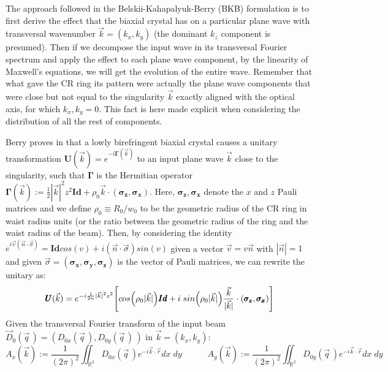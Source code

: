 \documentclass[11pt, a4paper, twoside]{article} %
\newcommand{\R}{\mathbb{R}} %
\begin{document}
The approach followed in the Belskii-Kahapalyuk-Berry (BKB) formulation is to first derive the effect that the biaxial crystal has on a particular plane wave with transversal wavenumber $\vec{k}=(k_x,k_y)$ (the dominant $k_z$ component is presumed). Then if we decompose the input wave in its transversal Fourier spectrum and apply the effect to each plane wave component, by the linearity of Maxwell's equations, we will get the evolution of the entire wave. Remember that what gave the CR ring its pattern were actually the plane wave components that were close but not equal to the singularity $\vec{k}$ exactly aligned with the optical axis, for which $k_x,k_y=0$. This fact is here made explicit when considering the distribution of all the rest of components.

Berry proves in \cite{Berry, BerryJeffrey} that a lowly birefringent biaxial crystal causes a unitary transformation $\pmb{U}(\vec{k})=e^{-i\pmb{\Gamma}(\vec{k})}$ to an input plane wave $\vec{k}$ close to the singularity, such that $\pmb{\Gamma}$ is the Hermitian operator $\pmb{\Gamma}(\vec{k}):=\frac{1}{2}|\vec{k}|^2z^2\pmb{Id}+\rho_0\vec{k}\cdot (\pmb{\sigma_z}, \pmb{\sigma_x})$. Here, $\pmb{\sigma_z}, \pmb{\sigma_x}$ denote the $x$ and $z$ Pauli matrices and we define $\rho_0\equiv R_0/w_0$ to be the geometric radius of the CR ring in waist radius units (or the ratio between the geometric radius of the ring and the waist radius of the beam). Then, by considering the identity $e^{i\vec{v}(\vec{n}\cdot \vec{\sigma})}=\pmb{Id}cos(v)+i(\vec{n}\cdot \vec{\sigma}) sin(v)$ given a vector $\vec{v}=v\vec{n}$ with $|\vec{n}|=1$ and given $\vec{\sigma}=(\pmb{\sigma_x},\pmb{\sigma_y},\pmb{\sigma_z})$ is the vector of Pauli matrices, we can rewrite the unitary as:\vspace{-0.1cm}
\begin{equation}
\pmb{U}(\vec{k}) = e^{-i\frac{1}{2n}|\vec{k}|^2z^2}\qty[cos\qty(\rho_0|\vec{k}|)\pmb{Id}+i\;sin\qty(\rho_0|\vec{k}|)\frac{\vec{k}}{|\vec{k}|}\cdot (\pmb{\sigma_z},\pmb{\sigma_x})]\vspace{-0.1cm}
\end{equation}
Given the transversal Fourier transform of the input beam $\vec{D}_0(\vec{q}\,)=(D_{0x}(\vec{q}\,), D_{0y}(\vec{q}\,)\,)$ in $\vec{k}=(k_x,k_y)$:
\begin{equation}
A_x(\vec{k}):=\frac{1}{(2\pi)^2}\iint_{\R^2} D_{0x}(\vec{q}\,)e^{-i\vec{k}\cdot\vec{r}}dx\;dy \quad \quad \quad A_y(\vec{k}):=\frac{1}{(2\pi)^2}\iint_{\R^2} D_{0y}(\vec{q}\,)e^{-i\vec{k}\cdot\vec{r}}dx\;dy
\end{equation}
\end{document}
